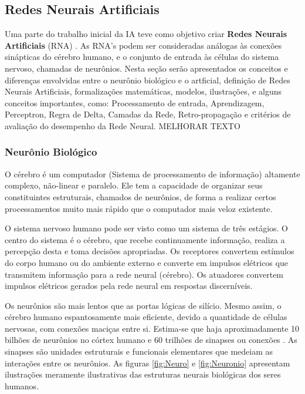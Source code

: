\subsection{Redes Neurais Artificiais}
\label{sec:RNA}

Uma parte do trabalho inicial da IA teve como objetivo criar \textbf{Redes Neurais Artificiais} (RNA) \cite{russell2004inteligencia}. As RNA's podem ser consideradas análogas às conexões sinápticas do cérebro humano, e o conjunto de entrada às células do sistema nervoso, chamadas de neurônios. Nesta seção serão apresentados os conceitos e diferenças envolvidas entre o neurônio biológico e o artficial, definição de Redes Neurais Artificiais, formalizações matemáticas, modelos, ilustrações, e alguns conceitos importantes, como: Processamento de entrada, Aprendizagem, Perceptron, Regra de Delta, Camadas da Rede, Retro-propagação e critérios de avaliação do desempenho da Rede Neural.
{\color{red} MELHORAR TEXTO}

\subsubsection{Neurônio Biológico}
    O cérebro é um computador (Sistema de processamento de informação) altamente complexo, não-linear e paralelo. Ele tem a capacidade de organizar seus constituintes estruturais, chamados de neurônios, de forma a realizar certos processamentos muito mais rápido que o computador mais veloz existente.
    
    O sistema nervoso humano pode ser visto como um sistema de três estágios. O centro do sistema é o cérebro, que recebe continuamente informação, realiza a percepção desta e toma decisões apropriadas. Os receptores convertem estímulos do corpo humano ou do ambiente externo e converte em impulsos elétricos que transmitem informação para a rede neural (cérebro). Os atuadores convertem impulsos elétricos gerados pela rede neural em respostas discerníveis.
    
    Os neurônios são mais lentos que as portas lógicas de silício. Mesmo assim, o cérebro humano espantosamente mais eficiente, devido a quantidade de células nervosas, com conexões maciças entre si. Estima-se que haja aproximadamente 10 bilhões de neurônios no córtex humano e 60 trilhões de sinapses ou conexões \cite{shepherd1990synaptic}. As sinapses são unidades estruturais e funcionais elementares que medeiam as interações entre os neurônios. As figuras \ref{fig:Neuro} e \ref{fig:Neuronio} apresentam ilustrações meramente ilustrativas das estruturas neurais biológicas dos seres humanos.
    
